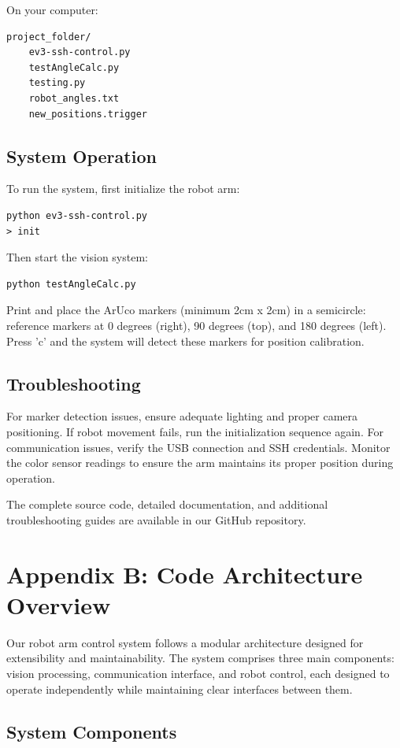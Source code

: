 \documentclass[10pt,twocolumn]{article}
\begin{document}
On your computer:
\begin{verbatim}
project_folder/
    ev3-ssh-control.py
    testAngleCalc.py
    testing.py
    robot_angles.txt
    new_positions.trigger
\end{verbatim}

\subsection*{System Operation}
To run the system, first initialize the robot arm:
\begin{verbatim}
python ev3-ssh-control.py
> init
\end{verbatim}

Then start the vision system:
\begin{verbatim}
python testAngleCalc.py
\end{verbatim}

Print and place the ArUco markers (minimum 2cm x 2cm) in a semicircle: reference markers at 0 degrees (right), 90 degrees (top), and 180 degrees (left). Press 'c' and the system will detect these markers for position calibration.

\subsection*{Troubleshooting}
For marker detection issues, ensure adequate lighting and proper camera positioning. If robot movement fails, run the initialization sequence again. For communication issues, verify the USB connection and SSH credentials. Monitor the color sensor readings to ensure the arm maintains its proper position during operation.

The complete source code, detailed documentation, and additional troubleshooting guides are available in our GitHub repository.

\section*{Appendix B: Code Architecture Overview}

Our robot arm control system follows a modular architecture designed for extensibility and maintainability. The system comprises three main components: vision processing, communication interface, and robot control, each designed to operate independently while maintaining clear interfaces between them.

\subsection*{System Components}
\end{document}
